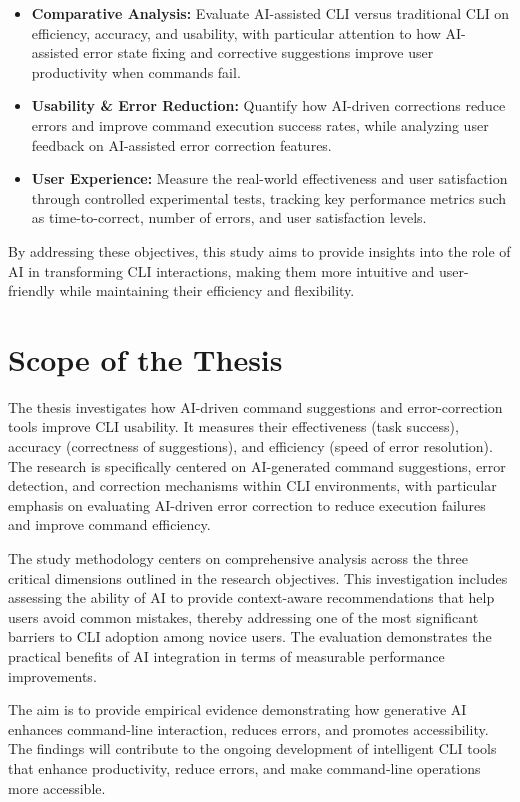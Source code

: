 \begin{itemize}
	\item \textbf{Comparative Analysis:} Evaluate AI-assisted CLI versus traditional CLI on efficiency, accuracy, and usability, with particular attention to how AI-assisted error state fixing and corrective suggestions improve user productivity when commands fail.
	\item \textbf{Usability \& Error Reduction:} Quantify how AI-driven corrections reduce errors and improve command execution success rates, while analyzing user feedback on AI-assisted error correction features.
	\item \textbf{User Experience:} Measure the real-world effectiveness and user satisfaction through controlled experimental tests, tracking key performance metrics such as time-to-correct, number of errors, and user satisfaction levels.
\end{itemize}

By addressing these objectives, this study aims to provide insights into the role of AI in transforming CLI interactions, making them more intuitive and user-friendly while maintaining their efficiency and flexibility.

\section{Scope of the Thesis}

The thesis investigates how AI-driven command suggestions and error-correction tools improve CLI usability. It measures their effectiveness (task success), accuracy (correctness of suggestions), and efficiency (speed of error resolution). The research is specifically centered on AI-generated command suggestions, error detection, and correction mechanisms within CLI environments, with particular emphasis on evaluating AI-driven error correction to reduce execution failures and improve command efficiency.

The study methodology centers on comprehensive analysis across the three critical dimensions outlined in the research objectives. This investigation includes assessing the ability of AI to provide context-aware recommendations that help users avoid common mistakes, thereby addressing one of the most significant barriers to CLI adoption among novice users. The evaluation demonstrates the practical benefits of AI integration in terms of measurable performance improvements.

The aim is to provide empirical evidence demonstrating how generative AI enhances command-line interaction, reduces errors, and promotes accessibility. The findings will contribute to the ongoing development of intelligent CLI tools that enhance productivity, reduce errors, and make command-line operations more accessible.



